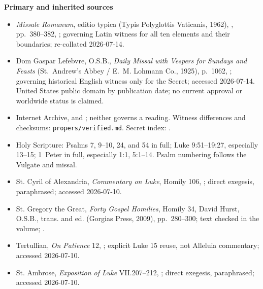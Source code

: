 \begin{deepstudy}
\textbf{Primary and inherited sources}
{\footnotesize
\begin{itemize}[itemsep=0em,topsep=0.15em,parsep=0pt]
\item \emph{Missale Romanum}, editio typica (Typis Polyglottis Vaticanis, 1962), , pp.~380--382, ; governing Latin witness for all ten elements and their boundaries; re-collated 2026-07-14.
\item Dom Gaspar Lefebvre, O.S.B., \emph{Daily Missal with Vespers for Sundays and Feasts} (St.~Andrew's Abbey / E.~M. Lohmann Co., 1925), p.~1062, ; governing historical English witness only for the Secret; accessed 2026-07-14. United States public domain by publication date; no current approval or worldwide status is claimed.
\item Internet Archive,  and ; neither governs a reading. Witness differences and checksums: \nolinkurl{propers/verified.md}. Secret index: .
\item Holy Scripture: Psalms 7, 9--10, 24, and 54 in full; Luke 9:51--19:27, especially 13--15; 1~Peter in full, especially 1:1, 5:1--14. Psalm numbering follows the Vulgate and missal.
\item St. Cyril of Alexandria, \emph{Commentary on Luke}, Homily 106, ; direct exegesis, paraphrased; accessed 2026-07-10.
\item St. Gregory the Great, \emph{Forty Gospel Homilies}, Homily 34, David Hurst, O.S.B., trans. and ed. (Gorgias Press, 2009), pp.~280--300; text checked in the volume; .
\item Tertullian, \emph{On Patience} 12, ; explicit Luke 15 reuse, not Alleluia commentary; accessed 2026-07-10.
\item St. Ambrose, \emph{Exposition of Luke} VII.207--212, ; direct exegesis, paraphrased; accessed 2026-07-10.

\end{itemize}}
\end{deepstudy}
